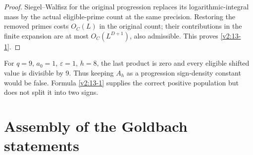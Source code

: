 \documentclass[11pt]{article}
\theoremstyle{definition}
\theoremstyle{remark}
\numberwithin{equation}{section}
\begin{document}
\begin{proof}
Siegel–Walfisz for the original progression replaces its logarithmic-integral mass by the actual eligible-prime count at the same precision. Restoring the removed primes costs $O_C(L)$ in the original count; their contributions in the finite expansion are at most $O_C(L^{D+1})$, also admissible. This proves \eqref{v2:13-1}. \end{proof}

For $q=9$, $a_0=1$, $\varepsilon=1$, $h=8$, the last product is zero and every eligible shifted value is divisible by 9. Thus keeping $A_h$ as a progression sign-density constant would be false. Formula \eqref{v2:13-1} supplies the correct positive population but does not split it into two signs.

\section{Assembly of the Goldbach statements}\label{sec:assembly}
\end{document}
